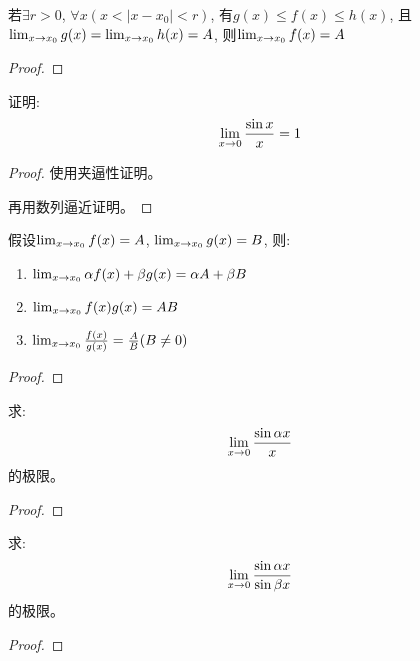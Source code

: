 \documentclass[lang=cn]{elegantbook}
\begin{document}
\begin{theorem}[函数极限的夹逼性定理]
    若$\exists r > 0$, $\forall x(x < \left| x - x_0 \right| < r)$, 有$g(x) \le f(x) \le h(x)$, 且$\lim_{x \to x_0 } g(x) = \lim_{x \to x_0 } h(x) = A$, 则$\lim_{x \to x_0 } f(x) = A$
\end{theorem}
\begin{proof}
    
\end{proof}

\begin{proposition}
    证明: 
    \[ \lim_{x \to 0 } \frac{\sin x}{x} = 1 \]
\end{proposition}
\begin{proof}
    使用夹逼性证明。

    再用数列逼近证明。
\end{proof}

\begin{theorem}[函数极限四则运算]
    假设$\lim_{x \to x_0 } f(x) = A$, $\lim_{x \to x_0 } g(x) = B$, 则: 
    \begin{enumerate}
        \item $\lim_{x \to x_0 } \alpha f(x) + \beta g(x) = \alpha A + \beta B$
        \item $\lim_{x \to x_0 } f(x)g(x) = AB$
        \item $\lim_{x \to x_0 } \frac{f(x)}{g(x)} = \frac{A}{B}(B \neq 0)$
    \end{enumerate}
\end{theorem}
\begin{proof}
    
\end{proof}

\begin{proposition}
    求:
    \[ \lim_{x \to 0 } \frac{\sin \alpha x}{x} \]
    的极限。
\end{proposition}
\begin{proof}
\end{proof}

\begin{proposition}
    求:
    \[ \lim_{x \to 0 } \frac{\sin \alpha x}{\sin \beta x} \]
    的极限。
\end{proposition}
\begin{proof}
    
\end{proof}

\end{document}
